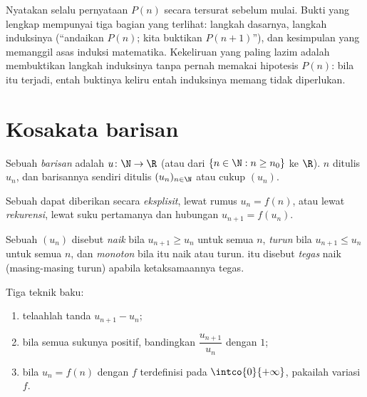 \begin{method}\label{met:g12:seq:induction}
Nyatakan selalu pernyataan $P(n)$ secara tersurat sebelum mulai. Bukti yang
lengkap mempunyai tiga bagian yang terlihat: langkah dasarnya, langkah
induksinya (``andaikan $P(n)$; kita buktikan $P(n+1)$''), dan kesimpulan yang
memanggil asas induksi matematika. Kekeliruan yang paling lazim adalah
membuktikan langkah induksinya tanpa pernah memakai hipotesis $P(n)$: bila itu
terjadi, entah buktinya keliru entah induksinya memang tidak diperlukan.
\end{method}

\section{Kosakata barisan}

\begin{definition}[Barisan]\label{def:g12:seq:sequence}
Sebuah \emph{barisan} adalah  $u \colon \N \to \R$ (atau
dari $\{n \in \N : n \geq n_0\}$ ke $\R$).  $n$ ditulis $u_n$, dan
barisannya sendiri ditulis $(u_n)_{n\in\N}$ atau cukup $(u_n)$.
\end{definition}

Sebuah  dapat diberikan secara \emph{eksplisit}, lewat rumus
$u_n = f(n)$, atau lewat \emph{rekurensi}, lewat suku pertamanya dan hubungan
$u_{n+1} = f(u_n)$.

\begin{definition}[Kemonotonan]\label{def:g12:seq:monotonic}
Sebuah  $(u_n)$ disebut \emph{naik} bila
$u_{n+1} \geq u_n$ untuk semua $n$, \emph{turun} bila $u_{n+1} \leq u_n$ untuk
semua $n$, dan \emph{monoton} bila  itu naik atau turun.  itu
disebut \emph{tegas} naik (masing-masing turun) apabila ketaksamaannya
tegas.
\end{definition}

\begin{method}\label{met:g12:seq:monotonicity}
Tiga teknik baku:
\begin{enumerate}
  \item telaahlah tanda $u_{n+1} - u_n$;
  \item bila semua sukunya positif, bandingkan $\dfrac{u_{n+1}}{u_n}$ dengan $1$;
  \item bila $u_n = f(n)$ dengan $f$ terdefinisi pada $\intco{0}{+\infty}$,
        pakailah variasi $f$.
\end{enumerate}
\end{method}


